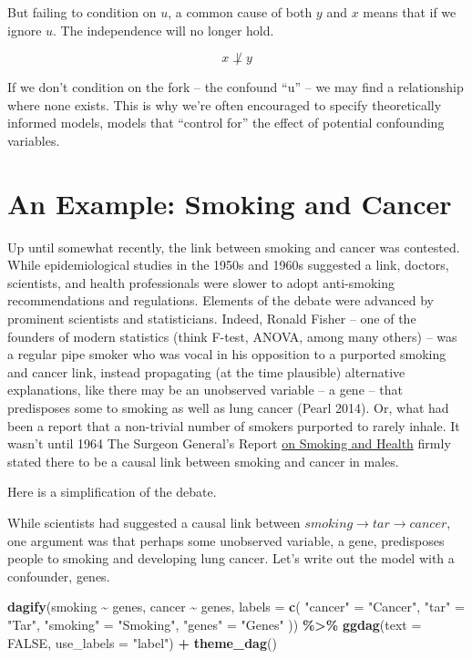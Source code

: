 \documentclass[
]{book}
\newenvironment{Shaded}{\begin{snugshade}}{\end{snugshade}}
\newcommand{\AttributeTok}[1]{\textcolor[rgb]{0.13,0.29,0.53}{#1}}
\newcommand{\ConstantTok}[1]{\textcolor[rgb]{0.56,0.35,0.01}{#1}}
\newcommand{\FunctionTok}[1]{\textcolor[rgb]{0.13,0.29,0.53}{\textbf{#1}}}
\newcommand{\NormalTok}[1]{#1}
\newcommand{\OtherTok}[1]{\textcolor[rgb]{0.56,0.35,0.01}{#1}}
\newcommand{\SpecialCharTok}[1]{\textcolor[rgb]{0.81,0.36,0.00}{\textbf{#1}}}
\newcommand{\StringTok}[1]{\textcolor[rgb]{0.31,0.60,0.02}{#1}}
\begin{document}
But failing to condition on \(u\), a common cause of both \(y\) and \(x\) means that if we ignore \(u\). The independence will no longer hold.

\[x \not \perp y \]

If we don't condition on the fork -- the confound ``u'' -- we may find a relationship where none exists. This is why we're often encouraged to specify theoretically informed models, models that ``control for'' the effect of potential confounding variables.

\section{An Example: Smoking and Cancer}\label{an-example-smoking-and-cancer}

Up until somewhat recently, the link between smoking and cancer was contested. While epidemiological studies in the 1950s and 1960s suggested a link, doctors, scientists, and health professionals were slower to adopt anti-smoking recommendations and regulations. Elements of the debate were advanced by prominent scientists and statisticians. Indeed, Ronald Fisher -- one of the founders of modern statistics (think F-test, ANOVA, among many others) -- was a regular pipe smoker who was vocal in his opposition to a purported smoking and cancer link, instead propagating (at the time plausible) alternative explanations, like there may be an unobserved variable -- a gene -- that predisposes some to smoking as well as lung cancer (Pearl 2014). Or, what had been a report that a non-trivial number of smokers purported to rarely inhale. It wasn't until 1964 The Surgeon General's Report \href{https://profiles.nlm.nih.gov/spotlight/nn/feature/smoking}{on Smoking and Health} firmly stated there to be a causal link between smoking and cancer in males.

Here is a simplification of the debate.

While scientists had suggested a causal link between \(smoking \rightarrow tar \rightarrow cancer\), one argument was that perhaps some unobserved variable, a gene, predisposes people to smoking and developing lung cancer. Let's write out the model with a confounder, genes.

\begin{Shaded}
\begin{Highlighting}[]
\FunctionTok{dagify}\NormalTok{(smoking }\SpecialCharTok{\textasciitilde{}}\NormalTok{ genes, cancer }\SpecialCharTok{\textasciitilde{}}\NormalTok{ genes, }
       \AttributeTok{labels =} \FunctionTok{c}\NormalTok{(}
  \StringTok{"cancer"} \OtherTok{=} \StringTok{"Cancer"}\NormalTok{,}
  \StringTok{"tar"} \OtherTok{=} \StringTok{"Tar"}\NormalTok{,}
  \StringTok{"smoking"} \OtherTok{=} \StringTok{"Smoking"}\NormalTok{,}
  \StringTok{"genes"} \OtherTok{=} \StringTok{"Genes"}
\NormalTok{)) }\SpecialCharTok{\%\textgreater{}\%} \FunctionTok{ggdag}\NormalTok{(}\AttributeTok{text =} \ConstantTok{FALSE}\NormalTok{, }\AttributeTok{use\_labels =} \StringTok{"label"}\NormalTok{)  }\SpecialCharTok{+} \FunctionTok{theme\_dag}\NormalTok{()}
\end{Highlighting}
\end{Shaded}
\end{document}
